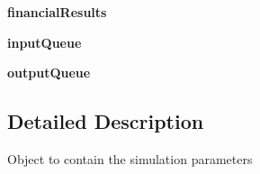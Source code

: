 \begin{DoxyCompactItemize}
\item 
\hypertarget{class_solar_calculator_1_1_simulation_1_1_simulation_a73d3cc1b27f9c347d746a016c6cd3001}{{\bfseries financial\-Results}}\label{class_solar_calculator_1_1_simulation_1_1_simulation_a73d3cc1b27f9c347d746a016c6cd3001}

\item 
\hypertarget{class_solar_calculator_1_1_simulation_1_1_simulation_a2ff21d1e0d90b00915970fcc5a34c827}{{\bfseries input\-Queue}}\label{class_solar_calculator_1_1_simulation_1_1_simulation_a2ff21d1e0d90b00915970fcc5a34c827}

\item 
\hypertarget{class_solar_calculator_1_1_simulation_1_1_simulation_a7fd479733e960cd4a17d3d79ac131db7}{{\bfseries output\-Queue}}\label{class_solar_calculator_1_1_simulation_1_1_simulation_a7fd479733e960cd4a17d3d79ac131db7}

\end{DoxyCompactItemize}


\subsection{Detailed Description}
\begin{DoxyVerb}Object to contain the simulation parameters\end{DoxyVerb}
 

